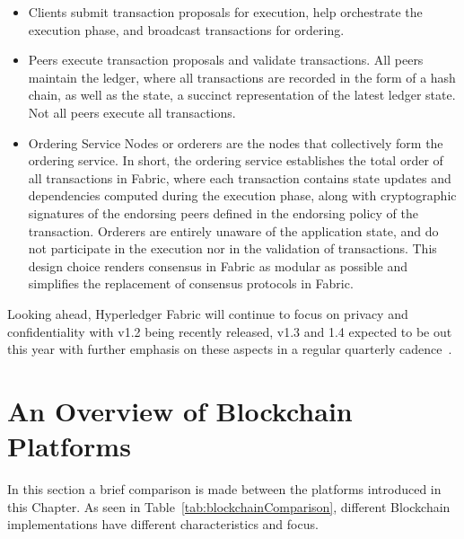 \begin{itemize}
  \item Clients submit transaction proposals for execution, help orchestrate
    the execution phase, and broadcast transactions for ordering.

  \item Peers execute transaction proposals and validate transactions.  All
    peers maintain the ledger, where all transactions  are recorded in the form
    of a hash chain, as well as the state, a succinct representation of the
    latest ledger state. Not all peers execute all transactions.

  \item Ordering Service Nodes or orderers are the nodes that collectively form
    the ordering service. In short, the ordering service establishes the total
    order of all transactions in Fabric, where each transaction contains state
    updates and dependencies computed during the execution phase, along with
    cryptographic signatures of the endorsing peers defined in the endorsing
    policy of the transaction. Orderers are entirely unaware of the application
    state, and do not participate in the execution nor in the validation of
    transactions. This design choice renders consensus in Fabric as modular as
    possible and simplifies the replacement of consensus protocols in Fabric. 
\end{itemize}

Looking ahead, Hyperledger Fabric will continue to focus on privacy and
confidentiality with v1.2 being recently released, v1.3 and 1.4 expected to be
out this year with further emphasis on these aspects in a regular quarterly
cadence~\cite{hyperledgerRoadmap2018}.

\section{An Overview of Blockchain Platforms}

In this section a brief comparison is made between the platforms introduced in
this Chapter. As seen in Table~\ref{tab:blockchainComparison}, different
Blockchain implementations have different characteristics and focus.

